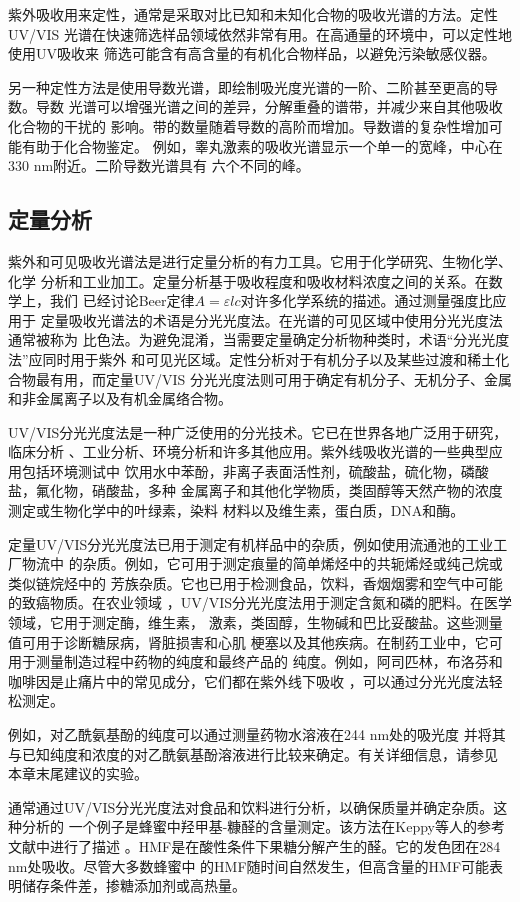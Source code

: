 紫外吸收用来定性，通常是采取对比已知和未知化合物的吸收光谱的方法。定性UV/VIS
光谱在快速筛选样品领域依然非常有用。在高通量的环境中，可以定性地使用UV吸收来
筛选可能含有高含量的有机化合物样品，以避免污染敏感仪器。

另一种定性方法是使用导数光谱，即绘制吸光度光谱的一阶、二阶甚至更高的导数。导数
光谱可以增强光谱之间的差异，分解重叠的谱带，并减少来自其他吸收化合物的干扰的
影响。带的数量随着导数的高阶而增加。导数谱的复杂性增加可能有助于化合物鉴定。
例如，睾丸激素的吸收光谱显示一个单一的宽峰，中心在330 nm附近。二阶导数光谱具有
六个不同的峰。
\subsection{定量分析}
紫外和可见吸收光谱法是进行定量分析的有力工具。它用于化学研究、生物化学、化学
分析和工业加工。定量分析基于吸收程度和吸收材料浓度之间的关系。在数学上，我们
已经讨论Beer定律$A = \varepsilon lc$对许多化学系统的描述。通过测量强度比应用于
定量吸收光谱法的术语是分光光度法。在光谱的可见区域中使用分光光度法通常被称为
比色法。为避免混淆，当需要定量确定分析物种类时，术语“分光光度法”应同时用于紫外
和可见光区域。定性分析对于有机分子以及某些过渡和稀土化合物最有用，而定量UV/VIS
分光光度法则可用于确定有机分子、无机分子、金属和非金属离子以及有机金属络合物。

UV/VIS分光光度法是一种广泛使用的分光技术。它已在世界各地广泛用于研究，临床分析
、工业分析、环境分析和许多其他应用。紫外线吸收光谱的一些典型应用包括环境测试中
饮用水中苯酚，非离子表面活性剂，硫酸盐，硫化物，磷酸盐，氟化物，硝酸盐，多种
金属离子和其他化学物质，类固醇等天然产物的浓度测定或生物化学中的叶绿素，染料
材料以及维生素，蛋白质，DNA和酶。

定量UV/VIS分光光度法已用于测定有机样品中的杂质，例如使用流通池的工业工厂物流中
的杂质。例如，它可用于测定痕量的简单烯烃中的共轭烯烃或纯己烷或类似链烷烃中的
芳族杂质。它也已用于检测食品，饮料，香烟烟雾和空气中可能的致癌物质。在农业领域
，UV/VIS分光光度法用于测定含氮和磷的肥料。在医学领域，它用于测定酶，维生素，
激素，类固醇，生物碱和巴比妥酸盐。这些测量值可用于诊断糖尿病，肾脏损害和心肌
梗塞以及其他疾病。在制药工业中，它可用于测量制造过程中药物的纯度和最终产品的
纯度。例如，阿司匹林，布洛芬和咖啡因是止痛片中的常见成分，它们都在紫外线下吸收
，可以通过分光光度法轻松测定。

例如，对乙酰氨基酚的纯度可以通过测量药物水溶液在244 nm处的吸光度
并将其与已知纯度和浓度的对乙酰氨基酚溶液进行比较来确定。有关详细信息，请参见
本章末尾建议的实验。

通常通过UV/VIS分光光度法对食品和饮料进行分析，以确保质量并确定杂质。这种分析的
一个例子是蜂蜜中羟甲基-糠醛的含量测定。该方法在Keppy等人的参考文献中进行了描述
。HMF是在酸性条件下果糖分解产生的醛。它的发色团在284 nm处吸收。尽管大多数蜂蜜中
的HMF随时间自然发生，但高含量的HMF可能表明储存条件差，掺糖添加剂或高热量。

